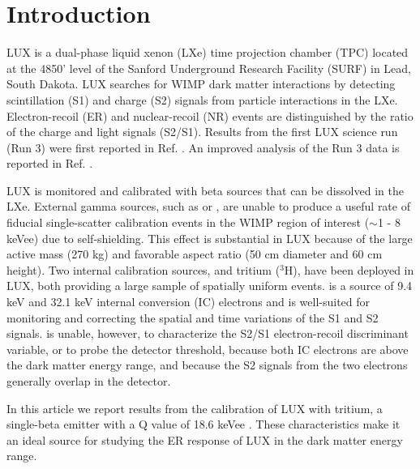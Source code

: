 \section{Introduction}

LUX is a dual-phase liquid xenon (LXe) time projection chamber (TPC) located at the 4850' level of the Sanford Underground Research Facility (SURF) in Lead, South Dakota. LUX searches for WIMP dark matter interactions by detecting scintillation (S1) and charge (S2) signals from particle interactions in the LXe. Electron-recoil (ER) and nuclear-recoil (NR) events are distinguished by the ratio of the charge and light signals (S2/S1). Results from the first LUX science run (Run 3) were first reported in Ref. \cite{lux-prl}. An improved analysis of the Run 3 data is reported in Ref. \cite{lux-reanalysis}.


LUX is monitored and calibrated with beta sources that can be dissolved in the LXe. External gamma sources, such as \cssrc or \thsrc, are unable to produce a useful rate of fiducial single-scatter calibration events in the WIMP region of interest ($\sim$1 - 8 keVee) due to self-shielding. This effect is substantial in LUX because of the large active mass (270 kg) and favorable aspect ratio (50 cm diameter and 60 cm height). Two internal calibration sources,  \krsrc\cite{Kastens:2009rt, baudis} and tritium ($^{3}$H), have been deployed in LUX, both providing a large sample of spatially uniform events. \krsrc is a source of 9.4 keV and 32.1 keV internal conversion  (IC) electrons and is well-suited for monitoring and correcting the spatial and time variations of the S1 and S2 signals. \krsrc is unable, however, to characterize the S2/S1 electron-recoil discriminant variable, or to probe the detector threshold, because both IC electrons are above the dark matter energy range, and because the S2 signals from the two electrons generally overlap in the detector.

In this article we report results from the calibration of LUX with tritium, a single-beta emitter with a Q value of 18.6 keVee \cite{Tritium_Q}.  These characteristics make it an ideal source for studying the ER response of LUX in the dark matter energy range. 

